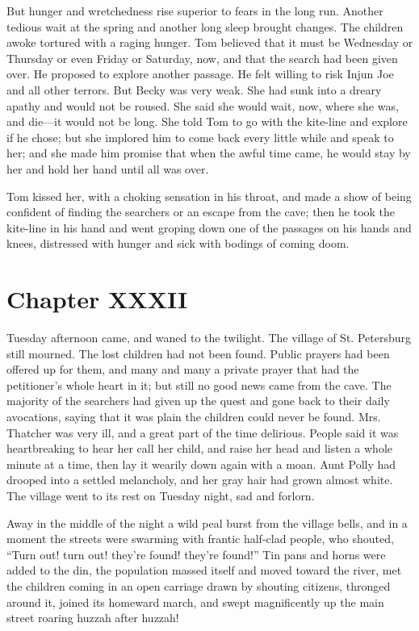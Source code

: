 \documentclass{book}
\begin{document}
But hunger and wretchedness rise superior to fears in the long run. Another tedious wait at the spring and another long sleep brought changes. The children awoke tortured with a raging hunger. Tom believed that it must be Wednesday or Thursday or even Friday or Saturday, now, and that the search had been given over. He proposed to explore another passage. He felt willing to risk Injun Joe and all other terrors. But Becky was very weak. She had sunk into a dreary apathy and would not be roused. She said she would wait, now, where she was, and die—it would not be long. She told Tom to go with the kite-line and explore if he chose; but she implored him to come back every little while and speak to her; and she made him promise that when the awful time came, he would stay by her and hold her hand until all was over.

Tom kissed her, with a choking sensation in his throat, and made a show of being confident of finding the searchers or an escape from the cave; then he took the kite-line in his hand and went groping down one of the passages on his hands and knees, distressed with hunger and sick with bodings of coming doom.

\chapter*{Chapter XXXII}

Tuesday afternoon came, and waned to the twilight. The village of St. Petersburg still mourned. The lost children had not been found. Public prayers had been offered up for them, and many and many a private prayer that had the petitioner’s whole heart in it; but still no good news came from the cave. The majority of the searchers had given up the quest and gone back to their daily avocations, saying that it was plain the children could never be found. Mrs. Thatcher was very ill, and a great part of the time delirious. People said it was heartbreaking to hear her call her child, and raise her head and listen a whole minute at a time, then lay it wearily down again with a moan. Aunt Polly had drooped into a settled melancholy, and her gray hair had grown almost white. The village went to its rest on Tuesday night, sad and forlorn.

Away in the middle of the night a wild peal burst from the village bells, and in a moment the streets were swarming with frantic half-clad people, who shouted, “Turn out! turn out! they’re found! they’re found!” Tin pans and horns were added to the din, the population massed itself and moved toward the river, met the children coming in an open carriage drawn by shouting citizens, thronged around it, joined its homeward march, and swept magnificently up the main street roaring huzzah after huzzah!
\end{document}
